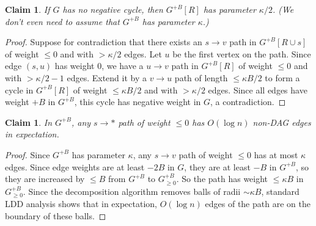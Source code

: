 \documentclass{article}
\newtheorem{claim}[theorem]{Claim}
\begin{document}
\begin{claim}
If $G$ has no negative cycle, then $G^{+B}[R]$ has parameter $\kappa/2$. (We don't even need to assume that $G^{+B}$ has parameter $\kappa$.)
\end{claim}
\begin{proof}
Suppose for contradiction that there exists an $s\to v$ path in $G^{+B}[R\cup s]$ of weight $\le0$ and with $>\kappa/2$ edges. Let $u$ be the first vertex on the path. Since edge $(s,u)$ has weight $0$, we have a $u\to v$ path in $G^{+B}[R]$ of weight $\le0$ and with $>\kappa/2-1$ edges. Extend it by a $v\to u$ path of length $\le\kappa B/2$ to form a cycle in $G^{+B}[R]$ of weight $\le\kappa B/2$ and with $>\kappa/2$ edges. Since all edges have weight $+B$ in $G^{+B}$, this cycle has negative weight in $G$, a contradiction.
\end{proof}

\begin{claim}
In $G^{+B}$, any $s\to *$ path of weight $\le0$ has $O(\log n)$ non-DAG edges in expectation.
\end{claim}
\begin{proof}
Since $G^{+B}$ has parameter $\kappa$, any $s\to v$ path of weight $\le0$ has at most $\kappa$ edges. Since edge weights are at least $-2B$ in $G$, they are at least $-B$ in $G^{+B}$, so they are increased by $\le B$ from $G^{+B}$ to $G^{+B}_{\ge0}$. So the path has weight $\le\kappa B$ in $G^{+B}_{\ge0}$. Since the decomposition algorithm removes balls of radii $\sim\kappa B$, standard LDD analysis shows that in expectation, $O(\log n)$ edges of the path are on the boundary of these balls.
\end{proof}
\end{document}
